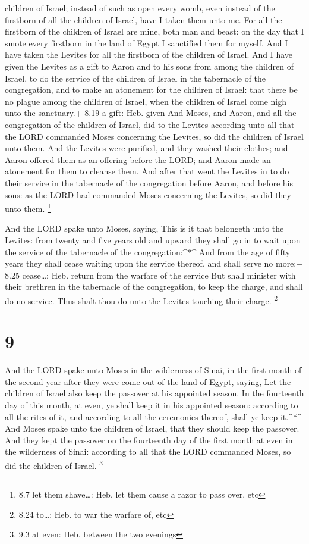 children of Israel; instead of such as open every womb, even instead of
the firstborn of all the children of Israel, have I taken them unto me.
 For all the firstborn of the children of Israel are mine,
both man and beast: on the day that I smote every firstborn in the land
of Egypt I sanctified them for myself.  And I have taken
the Levites for all the firstborn of the children of Israel.
 And I have given the Levites as a gift to Aaron and to his
sons from among the children of Israel, to do the service of the
children of Israel in the tabernacle of the congregation, and to make an
atonement for the children of Israel: that there be no plague among the
children of Israel, when the children of Israel come nigh unto the
sanctuary.+ 8.19 a gift: Heb. given  And Moses, and Aaron,
and all the congregation of the children of Israel, did to the Levites
according unto all that the LORD commanded Moses concerning the Levites,
so did the children of Israel unto them.  And the Levites
were purified, and they washed their clothes; and Aaron offered them as
an offering before the LORD; and Aaron made an atonement for them to
cleanse them.  And after that went the Levites in to do
their service in the tabernacle of the congregation before Aaron, and
before his sons: as the LORD had commanded Moses concerning the Levites,
so did they unto them. \footnote{8.7 let them shave\ldots: Heb. let them
  cause a razor to pass over, etc}

 And the LORD spake unto Moses, saying,  This
is it that belongeth unto the Levites: from twenty and five years old
and upward they shall go in to wait upon the service of the tabernacle
of the congregation:\^{}*\^{}  And from the age of fifty
years they shall cease waiting upon the service thereof, and shall serve
no more:+ 8.25 cease\ldots: Heb. return from the warfare of the service
 But shall minister with their brethren in the tabernacle
of the congregation, to keep the charge, and shall do no service. Thus
shalt thou do unto the Levites touching their charge. \footnote{8.24
  to\ldots: Heb. to war the warfare of, etc}

\hypertarget{section-8}{%
\section{9}\label{section-8}}

 And the LORD spake unto Moses in the wilderness of Sinai,
in the first month of the second year after they were come out of the
land of Egypt, saying,  Let the children of Israel also keep
the passover at his appointed season.  In the fourteenth day
of this month, at even, ye shall keep it in his appointed season:
according to all the rites of it, and according to all the ceremonies
thereof, shall ye keep it.\^{}*\^{}  And Moses spake unto
the children of Israel, that they should keep the passover. 
And they kept the passover on the fourteenth day of the first month at
even in the wilderness of Sinai: according to all that the LORD
commanded Moses, so did the children of Israel. \footnote{9.3 at even:
  Heb. between the two evenings}

